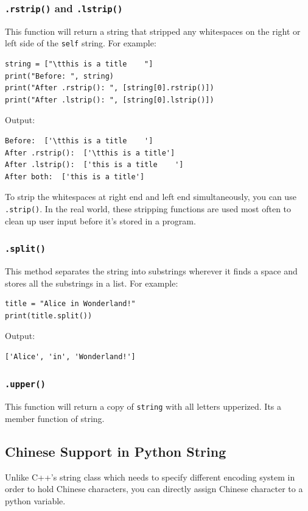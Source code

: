\documentclass[12pt]{book}
\begin{document}
\subsubsection{\texttt{.rstrip()} and \texttt{.lstrip()}}
\label{sec:org301742a}
This function will return a string that stripped any whitespaces on the right or left side of the \texttt{self} string. For example:
\begin{verbatim}
string = ["\tthis is a title    "]
print("Before: ", string)
print("After .rstrip(): ", [string[0].rstrip()])
print("After .lstrip(): ", [string[0].lstrip()])
\end{verbatim}
Output:
\begin{verbatim}
Before:  ['\tthis is a title    ']
After .rstrip():  ['\tthis is a title']
After .lstrip():  ['this is a title    ']
After both:  ['this is a title']
\end{verbatim}

To strip the whitespaces at right end and left end simultaneously, you can use \texttt{.strip()}. In the real world, these stripping functions are used most often to clean up user input before it’s stored in a program.
\subsubsection{\texttt{.split()}}
\label{sec:orgd961b3e}
This method separates the string into substrings wherever it finds a space and stores all the substrings in a list. For example:
\begin{verbatim}
title = "Alice in Wonderland!"
print(title.split())
\end{verbatim}
Output:
\begin{verbatim}
['Alice', 'in', 'Wonderland!']
\end{verbatim}

\subsubsection{\texttt{.upper()}}
\label{sec:org8a8f04e}
This function will return a copy of \texttt{string} with all letters upperized. Its a member function of string.

\subsection{Chinese Support in Python String}
\label{sec:org4363daa}
Unlike C++'s string class which needs to specify different encoding system in order to hold Chinese characters, you can directly assign Chinese character to a python variable.
\end{document}
